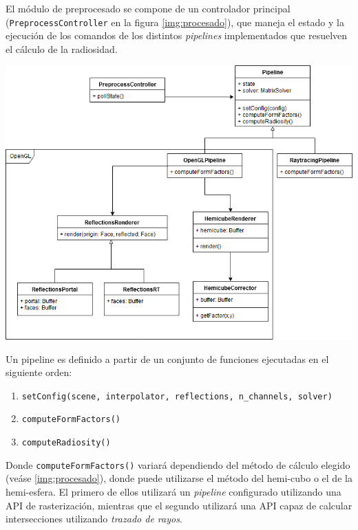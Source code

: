 El módulo de preprocesado se compone de un controlador principal (\verb|PreprocessController| en la figura \ref{img:procesado}), que maneja el estado y la ejecución de  los comandos de los distintos \textit{pipelines} implementados que resuelven el cálculo de la radiosidad.

\vspace{5mm}
\begin{minipage}[h]{0.8\linewidth}
	\centering
	\includegraphics[width=\linewidth]{assets/preprocess}
	\label{img:procesado}
\end{minipage}

Un pipeline es definido a partir de un conjunto de funciones ejecutadas en el siguiente orden:

\begin{enumerate}
	\item \verb|setConfig(scene, interpolator, reflections, n_channels, solver)|
	\item \verb|computeFormFactors()|
	\item \verb|computeRadiosity()|
\end{enumerate}

Donde \verb|computeFormFactors()| variará dependiendo del método de cálculo elegido (veáse \ref{img:procesado}), donde puede utilizarse el método del hemi-cubo o el de la hemi-esfera. El primero de ellos utilizará un \textit{pipeline} configurado utilizando una API de rasterización, mientras que el segundo utilizará una API capaz de calcular intersecciones utilizando \textit{trazado de rayos}.

